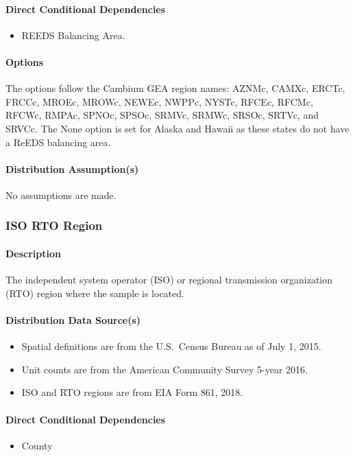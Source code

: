 \paragraph{Direct Conditional Dependencies}
\begin{itemize}
    \item REEDS Balancing Area.
\end{itemize}

\paragraph{Options}
The options follow the Cambium GEA region names: AZNMc, CAMXc, ERCTc, FRCCc, MROEc, MROWc, NEWEc, NWPPc, NYSTc, RFCEc, RFCMc, RFCWc, RMPAc, SPNOc, SPSOc, SRMVc, SRMWc, SRSOc, SRTVc, and SRVCc. The None option is set for Alaska and Hawaii as these states do not have a ReEDS balancing area.

\paragraph{Distribution Assumption(s)}
No assumptions are made.

\subsubsection{ISO RTO Region}
\paragraph{Description}
The independent system operator (ISO) or regional transmission organization (RTO) region where the sample is located.

\paragraph{Distribution Data Source(s)}
\begin{itemize}
    \item Spatial definitions are from the U.S.~Census Bureau as of July 1, 2015.
    \item Unit counts are from the American Community Survey 5-year 2016.
    \item ISO and RTO regions are from EIA Form 861, 2018.
\end{itemize}

\paragraph{Direct Conditional Dependencies}
\begin{itemize}
    \item County
\end{itemize}

